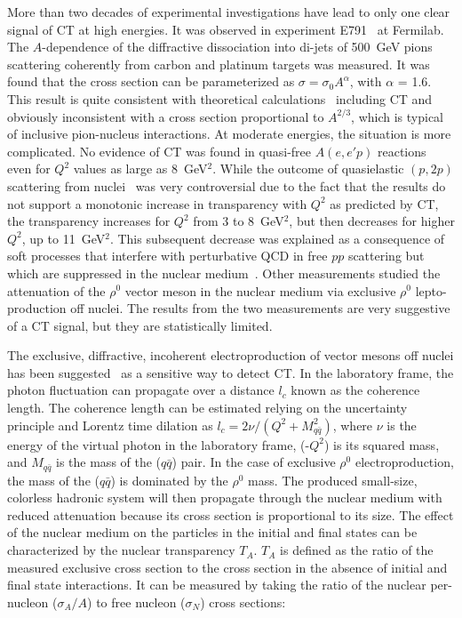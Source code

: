 More than two decades of experimental investigations have lead to only 
one clear signal of CT at high energies.  It was observed in experiment 
E791~\cite{Aita} at Fermilab.  The $A$-dependence of the diffractive 
dissociation into di-jets of 500~GeV pions scattering coherently from 
carbon and platinum targets was measured.  It was found that the cross 
section can be parameterized as $\sigma = \sigma_{0} A^{\alpha}$, with 
$\alpha$ = 1.6.  This result is quite consistent with theoretical 
calculations~\cite{Bert1,Bert2,Bert3} including CT and obviously 
inconsistent with a cross section proportional to $A^{2/3}$, which is 
typical of inclusive pion-nucleus interactions.  At moderate energies, 
the situation is more complicated.  No evidence of CT was found in 
quasi-free $A(e,e'p)$ reactions~\cite{eep1,eep2,eep3,eep4} even for $Q^2$ 
values as large as 8~GeV$^2$.  While the outcome of quasielastic $(p,2p)$ 
scattering from nuclei~\cite{p2p1,p2p2,p2p3} 
was very controversial due to the fact that the results do not support a 
monotonic increase in transparency with $Q^2$ as predicted by CT, the 
transparency increases for $Q^2$ from 3 to 8~GeV$^2$, but then decreases 
for higher $Q^2$, up to 11~GeV$^2$.  This subsequent decrease was 
explained as a consequence of soft processes that interfere with 
perturbative QCD in free $pp$ scattering but which are suppressed in the 
nuclear medium~\cite{ral}.  Other measurements studied the attenuation 
of the $\rho^0$ vector meson in the nuclear medium via exclusive $\rho^0$ 
lepto-production off nuclei.  The results from the two measurements
\cite{meso1,meso2} are very suggestive of a CT signal, but they are 
statistically limited.

The exclusive, diffractive, incoherent electroproduction of vector mesons 
off nuclei has been suggested~\cite{kop02} as a sensitive way to detect 
CT.  In the laboratory frame, the photon fluctuation can propagate over 
a distance $l_c$ known as the coherence length.  The coherence length can 
be estimated relying on the uncertainty principle and Lorentz time dilation 
as $l_c = 2 \nu/(Q^2 + M^2_{q\bar{q}})$, where $\nu$ is the energy of the 
virtual photon in the laboratory frame, (-$Q^2$) is its squared mass, and 
$M_{q\bar{q}}$ is the mass of the ($q\bar{q}$) pair.  In the case of 
exclusive $\rho^0$ electroproduction, the mass of the ($q\bar{q}$) is 
dominated by the $\rho^0$ mass.  The produced small-size, colorless 
hadronic system will then propagate through the nuclear medium with 
reduced attenuation because its cross section is proportional to its size. 
The effect of the nuclear medium on the particles in the initial and final 
states can be characterized by the nuclear transparency $T_A$.  $T_A$ is 
defined as the ratio of the measured exclusive cross section to the cross 
section in the absence of initial and final state interactions.  It can be 
measured by taking the ratio of the nuclear per-nucleon ($\sigma_A/A$) to 
free nucleon ($\sigma_N$) cross sections:

